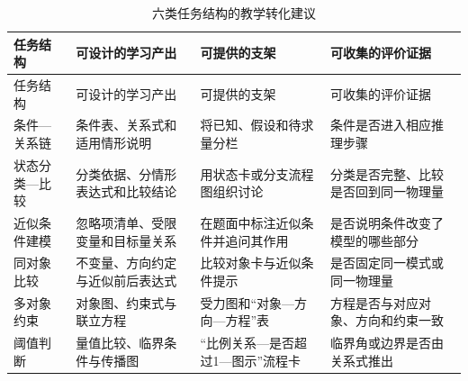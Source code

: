 \documentclass[
  12pt,
  a4paper]{ctexbook}
\begin{document}
\begin{longtable}[]{@{}
  >{\raggedright\arraybackslash}p{}
  >{\raggedright\arraybackslash}p{}
  >{\raggedright\arraybackslash}p{}
  >{\raggedright\arraybackslash}p{}@{}}
\caption{六类任务结构的教学转化建议}\tabularnewline
\toprule\noalign{}
\rowcolor{ThesisPale}
\begin{minipage}[b]{\linewidth}\raggedright
任务结构
\end{minipage} & \begin{minipage}[b]{\linewidth}\raggedright
可设计的学习产出
\end{minipage} & \begin{minipage}[b]{\linewidth}\raggedright
可提供的支架
\end{minipage} & \begin{minipage}[b]{\linewidth}\raggedright
可收集的评价证据
\end{minipage} \\
\midrule\noalign{}
\endfirsthead
\toprule\noalign{}
\rowcolor{ThesisPale}
\begin{minipage}[b]{\linewidth}\raggedright
任务结构
\end{minipage} & \begin{minipage}[b]{\linewidth}\raggedright
可设计的学习产出
\end{minipage} & \begin{minipage}[b]{\linewidth}\raggedright
可提供的支架
\end{minipage} & \begin{minipage}[b]{\linewidth}\raggedright
可收集的评价证据
\end{minipage} \\
\midrule\noalign{}
\endhead
\bottomrule\noalign{}
\endlastfoot
条件---关系链 & 条件表、关系式和适用情形说明 & 将已知、假设和待求量分栏
& 条件是否进入相应推理步骤 \\
状态分类---比较 & 分类依据、分情形表达式和比较结论 &
用状态卡或分支流程图组织讨论 & 分类是否完整、比较是否回到同一物理量 \\
近似条件建模 & 忽略项清单、受限变量和目标量关系 &
在题面中标注近似条件并追问其作用 & 是否说明条件改变了模型的哪些部分 \\
同对象比较 & 不变量、方向约定与近似前后表达式 & 比较对象卡与近似条件提示
& 是否固定同一模式或同一物理量 \\
多对象约束 & 对象图、约束式与联立方程 & 受力图和``对象---方向---方程''表
& 方程是否与对应对象、方向和约束一致 \\
阈值判断 & 量值比较、临界条件与传播图 &
``比例关系---是否超过1---图示''流程卡 & 临界角或边界是否由关系式推出 \\
\end{longtable}
\end{document}
